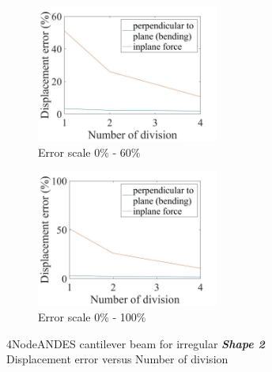 \documentclass[fleqn,11pt,letter]{article}
\begin{document}
\begin{figure}[H]
  \begin{subfigure}{0.5\textwidth}
    \centering
    \includegraphics[width=6cm]{../Figure_files/4NodeANDES/error4andes_beam_irregular_shape2.jpeg}
    \caption{Error scale 0\% - 60\%}
  \end{subfigure}
  \begin{subfigure}{0.5\textwidth}
    \centering
    \includegraphics[width=6cm]{../Figure_files/4NodeANDES/error4andes_beam_irregular_shape2100.jpeg}
    \caption{Error scale 0\% - 100\%}
  \end{subfigure}
  \captionsetup{justification=centering,margin=2cm}
  \caption{4NodeANDES cantilever beam for irregular \emph{\textbf{Shape 2}}\\
      Displacement error   versus   Number of division}
  \label{fig shape 2 4NodeANDES cantilever beam for irregular more elements}
\end{figure}

\end{document}
